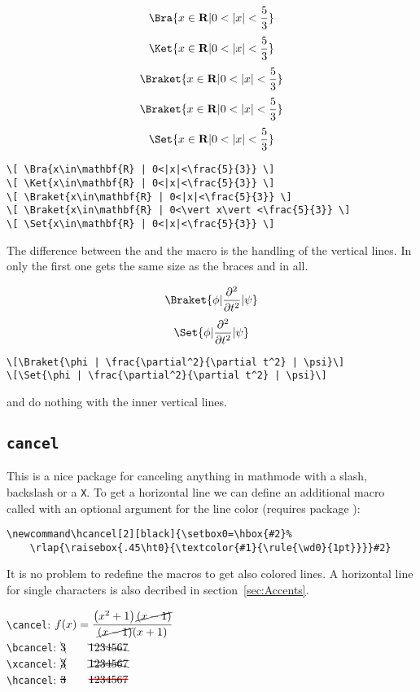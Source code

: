 \begin{table}[htb]
\[ \Bra{x\in\mathbf{R} | 0<|x|<\frac{5}{3}} \]
\[ \Ket{x\in\mathbf{R} | 0<|x|<\frac{5}{3}} \]
\[ \Braket{x\in\mathbf{R} | 0<|x|<\frac{5}{3}} \]
\[ \Braket{x\in\mathbf{R} | 0<\vert x\vert <\frac{5}{3}} \]
\[ \Set{x\in\mathbf{R} | 0<|x|<\frac{5}{3}} \]

\begin{lstlisting}
\[ \Bra{x\in\mathbf{R} | 0<|x|<\frac{5}{3}} \]
\[ \Ket{x\in\mathbf{R} | 0<|x|<\frac{5}{3}} \]
\[ \Braket{x\in\mathbf{R} | 0<|x|<\frac{5}{3}} \]
\[ \Braket{x\in\mathbf{R} | 0<\vert x\vert <\frac{5}{3}} \]
\[ \Set{x\in\mathbf{R} | 0<|x|<\frac{5}{3}} \]
\end{lstlisting}

The difference between the  and the  macro is the  handling of the
vertical lines. In  only the first one gets the same size as the
braces and in  all.

\[  \Braket{ \phi | \frac{\partial^2}{\partial t^2} | \psi }\]
\[  \Set{ \phi | \frac{\partial^2}{\partial t^2} | \psi }\]
\begin{lstlisting}
\[\Braket{\phi | \frac{\partial^2}{\partial t^2} | \psi}\]
\[\Set{\phi | \frac{\partial^2}{\partial t^2} | \psi}\]
\end{lstlisting}


 and  do nothing with the inner vertical lines.


\subsection{\texttt{cancel}}\label{cancel.sty}
This is a nice package for canceling anything in mathmode with a slash, 
backslash or a \verb+X+. To get
a horizontal line we can define an additional macro called  
with an optional argument
for the line color (requires package ):
%
\begin{lstlisting}
\newcommand\hcancel[2][black]{\setbox0=\hbox{#2}%
	\rlap{\raisebox{.45\ht0}{\textcolor{#1}{\rule{\wd0}{1pt}}}}#2}
\end{lstlisting}

It is no problem to redefine the  macros to get also colored lines. 
A horizontal line for
single characters is also decribed in section~\vref{sec:Accents}.

\medskip
\noindent
\verb+\cancel+: $f(x)=\dfrac{\left(x^2+1\right)\cancel{(x-1)}}{\cancel{(x-1)}(x+1)}$\\[0.5cm]
\verb+\bcancel+: $\bcancel{3}\qquad\bcancel{1234567}$\\[0.5cm]
\verb+\xcancel+: $\xcancel{3}\qquad\xcancel{1234567}$\\[0.5cm]
\verb+\hcancel+: $\hcancel{3}\qquad\hcancel[red]{1234567}$


\end{table}
